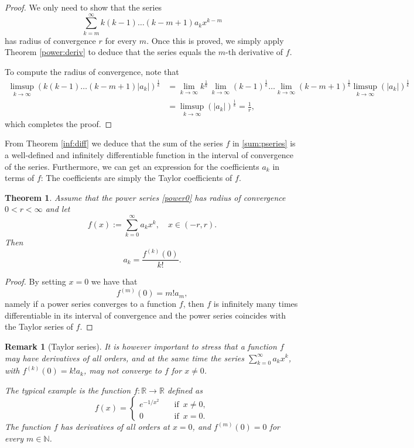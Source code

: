 \documentclass[a4paper,reqno]{amsart}
\numberwithin{equation}{section}
\newtheorem{theorem}[definition]{Theorem}
\newtheorem{remark}[definition]{Remark}
\def\N{\mathbb{N}}
\def\R{\mathbb{R}}
\begin{document}
\begin{proof}
We only need to show that the series
$$
\sum_{k=m}^\infty k(k-1)\dots(k-m+1)a_kx^{k-m}
$$
has radius of convergence $r$ for every $m$. Once this is proved, we simply apply Theorem  \ref{power:deriv} to deduce that the series equals the
$m$-th derivative of $f$.

To compute the radius of convergence, note that
\begin{align*}
\limsup_{k\to \infty} \left( k(k-1)\dots(k-m+1)|a_k|\right)^{\frac{1}k}  &= \lim_{k\to \infty}  k^{\frac{1}k} \, \lim_{k\to \infty}  (k-1)^{\frac{1}k} \dots \lim_{k\to \infty}  (k-m+1)^{\frac{1}k} \limsup_{k\to \infty} (|a_k|)^{\frac1k} \\
&= \limsup_{k\to \infty} (|a_k|)^{\frac1k}  = \frac1r,
\end{align*}
which completes the proof.
\end{proof}

From Theorem \ref{inf:diff} we deduce that the sum of the series $f$ in \eqref{sum:pseries} is a well-defined and infinitely differentiable function in the interval of convergence of the series. Furthermore, we can get an expression for the coefficients $a_k$ in terms of $f$: The coefficients are simply the Taylor coefficients of $f$.


\begin{theorem}\label{thm:Taylor}
Assume that the power series \eqref{power0} has radius of convergence $0<r<\infty$ and let
\begin{equation*}
f(x):= \sum_{k=0}^\infty a_k x^k, \quad x\in (-r,r).
\end{equation*}
Then
$$
a_k = \frac{f^{(k)}(0)}{k!}.
$$
\end{theorem}
\begin{proof}
By setting $x=0$ we have that
$$
f^{(m)}(0) = m! a_m,
$$
namely if a power series converges to a function $f$, then $f$ is infinitely many times differentiable in its interval of convergence and the power series coincides with the Taylor series of $f$.
\end{proof}

\begin{remark}[Taylor series]
It is however important to stress that a function $f$ may have derivatives of all orders, and at the same time the series $\sum_{k=0}^\infty a_k x^k$, with $f^{(k)}(0) = k! a_k$, may not converge to $f$ for
$x\neq 0$.

The typical example is the function $f:\R\to \R$ defined as
$$
f(x) = \begin{cases}
e^{-1/x^2} \quad &\textrm{if } \, x\neq 0,\\
0 \quad &\textrm{if } \, x= 0.
\end{cases}
$$
The function $f$ has derivatives of all orders at $x=0$, and $f^{(m)}(0)=0$ for every $m\in \N$.
\end{remark}
\end{document}
